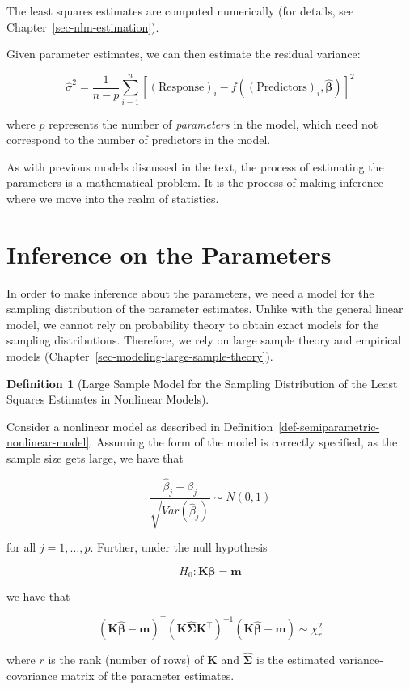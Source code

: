 \documentclass[
  letterpaper,
  DIV=11,
  numbers=noendperiod]{scrreprt}
\theoremstyle{definition}
\newtheorem{definition}{Definition}[chapter]
\theoremstyle{definition}
\theoremstyle{remark}
\begin{document}
The least squares estimates are computed numerically (for details, see
Chapter~\ref{sec-nlm-estimation}).

Given parameter estimates, we can then estimate the residual variance:

\[\widehat{\sigma}^2 = \frac{1}{n-p} \sum\limits_{i=1}^{n} \left[(\text{Response})_i - f\left((\text{Predictors})_i, \widehat{\boldsymbol{\beta}}\right)\right]^2\]

where \(p\) represents the number of \emph{parameters} in the model,
which need not correspond to the number of predictors in the model.

As with previous models discussed in the text, the process of estimating
the parameters is a mathematical problem. It is the process of making
inference where we move into the realm of statistics.

\hypertarget{inference-on-the-parameters}{%
\section{Inference on the
Parameters}\label{inference-on-the-parameters}}

In order to make inference about the parameters, we need a model for the
sampling distribution of the parameter estimates. Unlike with the
general linear model, we cannot rely on probability theory to obtain
exact models for the sampling distributions. Therefore, we rely on large
sample theory and empirical models
(Chapter~\ref{sec-modeling-large-sample-theory}).

\begin{definition}[Large Sample Model for the Sampling Distribution of
the Least Squares Estimates in Nonlinear
Models]\protect\hypertarget{def-nlm-samp-distns}{}\label{def-nlm-samp-distns}

Consider a nonlinear model as described in
Definition~\ref{def-semiparametric-nonlinear-model}. Assuming the form
of the model is correctly specified, as the sample size gets large, we
have that

\[\frac{\widehat{\beta}_j - \beta_j}{\sqrt{Var\left(\widehat{\beta}_j\right)}} \sim N(0, 1)\]

for all \(j = 1, \dotsc, p\). Further, under the null hypothesis

\[H_0: \mathbf{K}\boldsymbol{\beta} = \mathbf{m}\]

we have that

\[\left(\mathbf{K}\widehat{\boldsymbol{\beta}} - \mathbf{m}\right)^\top \left(\mathbf{K}\widehat{\boldsymbol{\Sigma}}\mathbf{K}^\top\right)^{-1} \left(\mathbf{K}\widehat{\boldsymbol{\beta}} - \mathbf{m}\right) \sim \chi^2_r\]

where \(r\) is the rank (number of rows) of \(\mathbf{K}\) and
\(\widehat{\boldsymbol{\Sigma}}\) is the estimated variance-covariance
matrix of the parameter estimates.

\end{definition}
\end{document}
